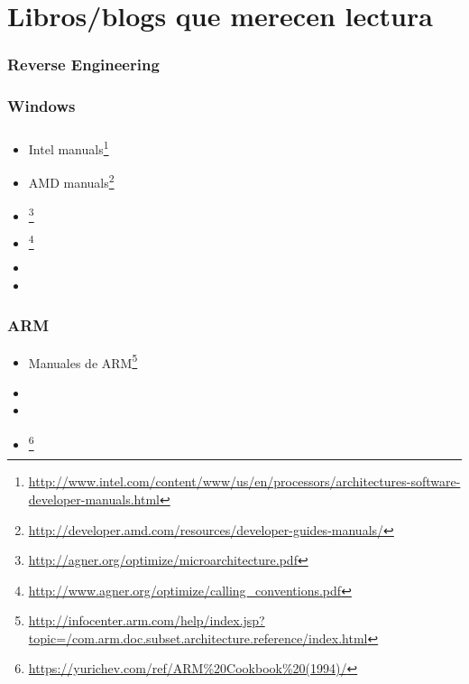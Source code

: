 \chapter{Libros/blogs que merecen lectura}


\subsection{Reverse Engineering}




\subsection{Windows}



\subsection{\CCpp}



\label{x86_manuals}
\begin{itemize}
\item Intel manuals\footnote{\AlsoAvailableAs \url{http://www.intel.com/content/www/us/en/processors/architectures-software-developer-manuals.html}}

\item AMD manuals\footnote{\AlsoAvailableAs \url{http://developer.amd.com/resources/developer-guides-manuals/}}

\item \AgnerFog{}\footnote{\AlsoAvailableAs \url{http://agner.org/optimize/microarchitecture.pdf}}

\item \AgnerFogCC{}\footnote{\AlsoAvailableAs \url{http://www.agner.org/optimize/calling_conventions.pdf}}

\item \IntelOptimization

\item \AMDOptimization
\end{itemize}

\subsection{ARM}

\begin{itemize}
\item Manuales de ARM\footnote{\AlsoAvailableAs \url{http://infocenter.arm.com/help/index.jsp?topic=/com.arm.doc.subset.architecture.reference/index.html}}

\item \ARMSevenRef

\item \ARMSixFourRefURL

\item \ARMCookBook\footnote{\AlsoAvailableAs \url{https://yurichev.com/ref/ARM%20Cookbook%20(1994)/}}
\end{itemize}

